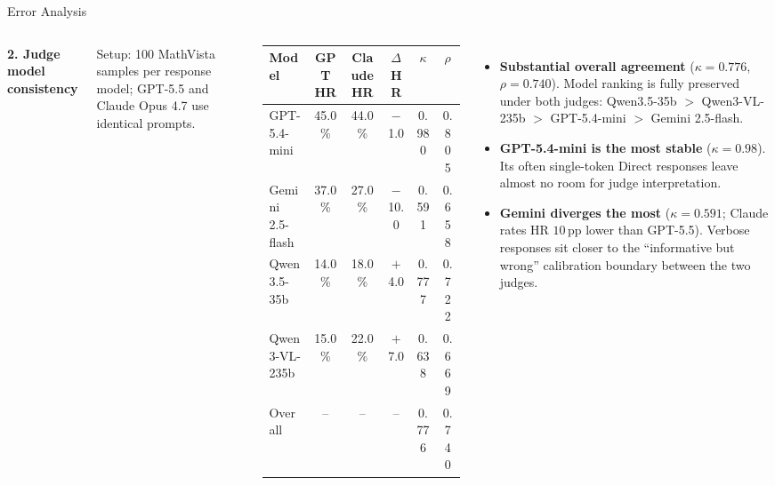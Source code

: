 \documentclass[9pt,aspectratio=169]{beamer}
\begin{document}
\begin{frame}{Error Analysis}
  \begin{columns}[T,onlytextwidth]
      \textbf{\small 2. Judge model consistency}

      \vspace{0.15em}
      \scriptsize
      Setup: 100 MathVista samples per response model;
      GPT-5.5 and Claude Opus 4.7 use identical prompts.

      \vspace{0.2em}
      \centering
      \renewcommand{\arraystretch}{0.9}
      \begin{tabular}{lccccc}
        \toprule
        Model & GPT HR & Claude HR & $\Delta$HR & $\kappa$ & $\rho$ \\
        \midrule
        GPT-5.4-mini & 45.0\% & 44.0\% & $-$1.0 & 0.980 & 0.805 \\
        Gemini 2.5-flash & 37.0\% & 27.0\% & \alert{$-$10.0} & 0.591 & 0.658 \\
        Qwen3.5-35b & 14.0\% & 18.0\% & $+$4.0 & 0.777 & 0.722 \\
        Qwen3-VL-235b & 15.0\% & 22.0\% & $+$7.0 & 0.638 & 0.669 \\
        \midrule
        Overall & -- & -- & -- & \alert{0.776} & \alert{0.740} \\
        \bottomrule
      \end{tabular}

      \vspace{0.3em}
      \raggedright
      \begin{itemize}\setlength{\itemsep}{0.18em}\setlength{\parskip}{0pt}
        \item \textbf{Substantial overall agreement}
              ($\kappa = 0.776$, $\rho = 0.740$).
              Model ranking is fully preserved under both judges:
              Qwen3.5-35b $>$ Qwen3-VL-235b $>$ GPT-5.4-mini $>$ Gemini 2.5-flash.
        \item \textbf{GPT-5.4-mini is the most stable} ($\kappa = 0.98$).
              Its often single-token Direct responses leave
              almost no room for judge interpretation.
        \item \textbf{Gemini diverges the most} ($\kappa = 0.591$;
              Claude rates HR $10$\,pp lower than GPT-5.5).
              Verbose responses sit closer to the
              ``informative but wrong'' calibration boundary
              between the two judges.
              

\end{itemize}
\end{columns}
\end{frame}
\end{document}
